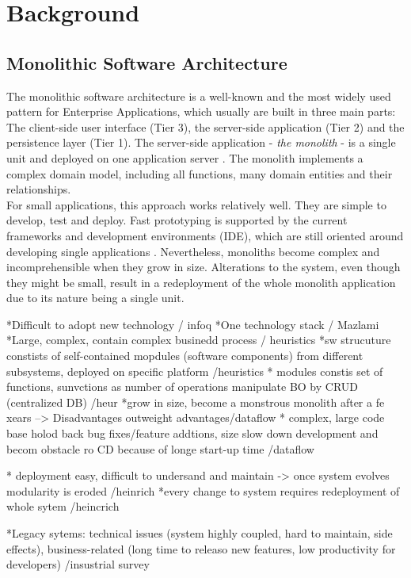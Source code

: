 \chapter{Background}
\label{ch:background}

\section{Monolithic Software Architecture}
\label{sec:background:monolith}
The monolithic software architecture is a well-known and the most widely used pattern for Enterprise Applications, which usually are built in three main parts: The client-side user interface (Tier 3), the server-side application (Tier 2) and the persistence layer (Tier 1). The server-side application - \textit{the monolith} - is a single unit and deployed on one application server \cite{infoq}. The monolith implements a complex domain model, including all functions, many domain entities and their relationships.
\\
For small applications, this approach works relatively well. They are simple to develop, test and deploy. Fast prototyping is supported by the current frameworks and development environments (IDE), which are still oriented around developing single applications \cite{infoq}. Nevertheless, monoliths become complex and incomprehensible \cite{DataflowDrivenChen} when they grow in size. Alterations to the system, even though they might be small, result in a redeployment of the whole monolith application due to its nature being a single unit. 

*Difficult to adopt new technology / infoq
*One technology stack  / Mazlami
*Large, complex, contain complex businedd process / heuristics
*sw strucuture constists of self-contained mopdules (software components) from different subsystems, deployed on specific platform /heuristics
* modules constis set of functions, sunvctions as number of operations manipulate BO by CRUD (centralized DB) /heur
*grow in size, become a monstrous monolith after a fe xears --> Disadvantages outweight advantages/dataflow
* complex, large code base holod back bug fixes/feature addtions, size slow down development and becom obstacle ro CD because of longe start-up time /dataflow

 * deployment easy, difficult to undersand and maintain -> once system evolves modularity is eroded /heinrich
 *every change to system requires redeployment of whole sytem /heincrich

*Legacy sytems: technical issues (system highly coupled, hard to maintain, side effects), business-related (long time to releaso new features, low productivity for developers) /insustrial survey

